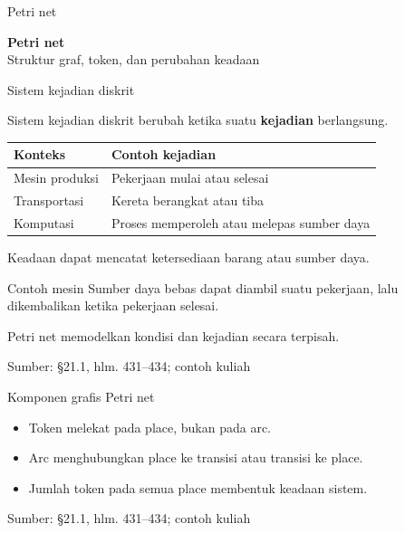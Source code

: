 \documentclass[aspectratio=169,11pt]{beamer}
\newcommand{\source}[1]{%
    \vfill
    \hfill{\tiny\color{gray}Sumber: #1}
}
\newcommand{\tok}[1]{\fill[AcademicBlue] (#1.center) circle (2.2pt);}
\begin{document}
\begin{frame}{Petri net}
\begin{center}{\LARGE\bfseries\color{AcademicBlue}Petri net}\\[8mm]Struktur graf, token, dan perubahan keadaan\end{center}
\end{frame}
\begin{frame}{Sistem kejadian diskrit}

Sistem kejadian diskrit berubah ketika suatu \textbf{kejadian} berlangsung.
\begin{center}\begin{tabular}{ll}\toprule
Konteks&Contoh kejadian\\\midrule
Mesin produksi&Pekerjaan mulai atau selesai\\
Transportasi&Kereta berangkat atau tiba\\
Komputasi&Proses memperoleh atau melepas sumber daya\\\bottomrule
\end{tabular}\end{center}
Keadaan dapat mencatat ketersediaan barang atau sumber daya.
\begin{block}{Contoh mesin}
Sumber daya bebas dapat diambil suatu pekerjaan,
lalu dikembalikan ketika pekerjaan selesai.
\end{block}
Petri net memodelkan kondisi dan kejadian secara terpisah.

\source{\S21.1, hlm. 431--434; contoh kuliah}
\end{frame}
\begin{frame}{Komponen grafis Petri net}

\begin{center}\end{center}
\begin{itemize}
\item Token melekat pada place, bukan pada arc.
\item Arc menghubungkan place ke transisi atau transisi ke place.
\item Jumlah token pada semua place membentuk keadaan sistem.
\end{itemize}

\source{\S21.1, hlm. 431--434; contoh kuliah}
\end{frame}
\end{document}
